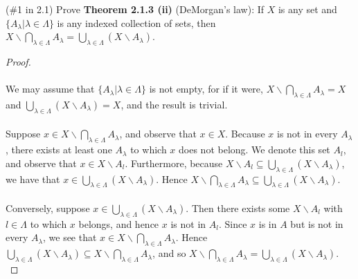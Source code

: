 (\#1 in 2.1) Prove \textbf{Theorem 2.1.3 (ii)} (DeMorgan's law): If $X$ is any 
set and $\{A_{\lambda}|\lambda\in\Lambda\}$ is any indexed collection of sets,
then $X\backslash \bigcap\limits_{\lambda\in\Lambda} A_{\lambda} 
       = \bigcup\limits_{\lambda\in\Lambda}(X\backslash A_{\lambda})$.

\begin{proof}\ \\\\
    We may assume that $\{A_{\lambda}|\lambda\in\Lambda\}$ is not empty, for
    if it were,
    $X\backslash \bigcap\limits_{\lambda\in\Lambda} A_{\lambda} = X$ and
    $ \bigcup\limits_{\lambda\in\Lambda}(X\backslash A_{\lambda}) = X$, and
    the result is trivial. \\\\

    Suppose $x \in X \backslash \bigcap\limits_{\lambda \in \Lambda}{A_\lambda}$,
    and observe that $x \in X$. Because $x$ is not in every
    $A_{\lambda}$, there exists at least one $A_{\lambda}$ to which $x$
    does not belong. We denote this set $A_l$, and observe that
    $x \in X \backslash A_l$. Furthermore, because
    $X \backslash A_l \subseteq
       \bigcup\limits_{\lambda\in\Lambda}(X\backslash A_{\lambda})$,
    we have that $x \in \bigcup\limits_{\lambda\in\Lambda}(X\backslash A_{\lambda})$.
    Hence $X\backslash \bigcap\limits_{\lambda\in\Lambda} A_{\lambda} 
     \subseteq \bigcup\limits_{\lambda\in\Lambda}(X\backslash A_{\lambda})$. \\\\


    Conversely, suppose
    $x \in \bigcup\limits_{\lambda\in\Lambda}(X\backslash A_{\lambda})$.
    Then there exists some $X \backslash A_l$ with 
    $l \in \Lambda$ to which $x$ belongs, and hence $x$ is not in $A_l$.
    Since $x$ is in $A$ but is not in every $A_\lambda$, we see that
    $x \in X \backslash \bigcap\limits_{\lambda \in \Lambda}{A_\lambda}$.
    Hence $\bigcup\limits_{\lambda\in\Lambda}(X\backslash A_{\lambda})
     \subseteq X\backslash \bigcap\limits_{\lambda\in\Lambda} A_{\lambda}$,
    and so $X\backslash \bigcap\limits_{\lambda\in\Lambda} A_{\lambda} 
            = \bigcup\limits_{\lambda\in\Lambda}(X\backslash A_{\lambda})$.
    \\
\end{proof}